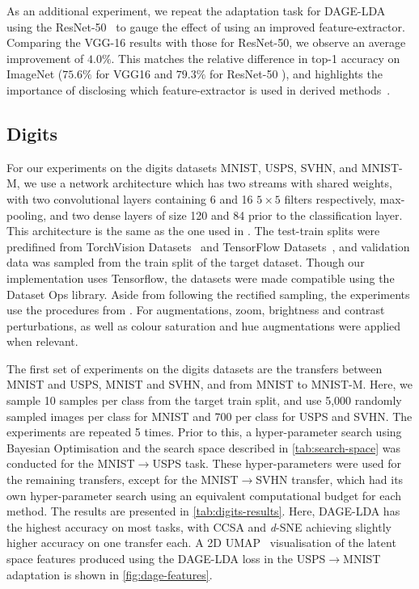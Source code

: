 \documentclass[journal]{IEEEtran}
\begin{document}
As an additional experiment, we repeat the adaptation task for DAGE-LDA using the ResNet-50~\cite{he2016deep} to gauge the effect of using an improved feature-extractor. Comparing the VGG-16 results with those for ResNet-50, we observe an average improvement of $4.0\%$. This matches the relative difference in top-1 accuracy on ImageNet ($75.6\%$ for VGG16 and $79.3\%$ for ResNet-50 \cite{he2016deep}), and highlights the importance of disclosing which feature-extractor is used in derived methods~\cite{musgrave2020metric}.


\subsection{Digits}
For our experiments on the digits datasets MNIST, USPS, SVHN, and MNIST-M, we use a network architecture which has two streams with shared weights, with two convolutional layers containing 6 and 16 $5 \times 5$ filters respectively, max-pooling, and two dense layers of size 120 and 84 prior to the classification layer. This architecture is the same as the one used in \cite{motiian2017ccsa}. 
The test-train splits were predifined from TorchVision Datasets~\cite{marcel2010torchvision} and TensorFlow Datasets~\cite{tfds}, and validation data was sampled from the train split of the target dataset. 
Though our implementation uses Tensorflow, the datasets were made compatible using the Dataset Ops library.
Aside from following the rectified sampling, the experiments use the procedures from \cite{fernando2014joint, motiian2017ccsa, xu2019dsne}.
For augmentations, zoom, brightness and contrast perturbations, as well as colour saturation and hue augmentations were applied when relevant. 

The first set of experiments on the digits datasets are the transfers between MNIST and USPS, MNIST and SVHN, and from MNIST to MNIST-M.
Here, we sample 10 samples per class from the target train split, and use 5,000 randomly sampled images per class for MNIST and 700 per class for USPS and SVHN.
The experiments are repeated 5 times.
Prior to this, a hyper-parameter search using Bayesian Optimisation and the search space described in \cref{tab:search-space} was conducted for the MNIST$\rightarrow$USPS task. 
These hyper-parameters were used for the remaining transfers, except for the MNIST$\rightarrow$SVHN transfer, which had its own hyper-parameter search using an equivalent computational budget for each method.
The results are presented in \cref{tab:digits-results}.
Here, DAGE-LDA has the highest accuracy on most tasks, with CCSA and \textit{d}-SNE achieving slightly higher accuracy on one transfer each. 
A 2D UMAP~\cite{mcinnes2018umap} visualisation of the latent space features produced using the DAGE-LDA loss in the USPS$\rightarrow$MNIST adaptation is shown in \cref{fig:dage-features}.
\end{document}
